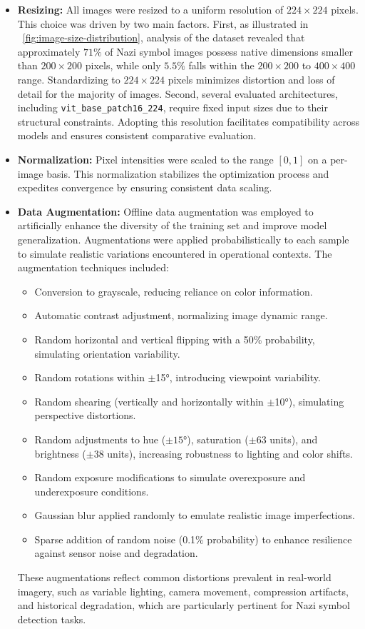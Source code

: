 \begin{itemize}
  \item \textbf{Resizing:} All images were resized to a uniform resolution of $224 \times 224$ pixels. This choice
  was driven by two main factors. First, as illustrated in ~\autoref{fig:image-size-distribution}, analysis
  of the dataset revealed that approximately $71\%$ of Nazi symbol images possess native dimensions smaller than
  $200 \times 200$ pixels, while only $5.5\%$ falls within the $200 \times 200$ to $400 \times 400$ range.
  Standardizing to $224 \times 224$ pixels minimizes distortion and loss of detail for the majority of images. Second,
  several evaluated architectures, including \texttt{vit\_base\_patch16\_224}, require fixed input sizes due to
  their structural constraints. Adopting this resolution facilitates compatibility across models and ensures
  consistent comparative evaluation.

  \item \textbf{Normalization:} Pixel intensities were scaled to the range $[0,1]$ on a per-image basis. This
  normalization stabilizes the optimization process and expedites convergence by ensuring consistent data scaling.

  \item \textbf{Data Augmentation:} Offline data augmentation was employed to artificially enhance the diversity of
  the training set and improve model generalization. Augmentations were applied probabilistically to each sample to
  simulate realistic variations encountered in operational contexts. The augmentation techniques included:
  \begin{itemize}
    \item Conversion to grayscale, reducing reliance on color information.
    \item Automatic contrast adjustment, normalizing image dynamic range.
    \item Random horizontal and vertical flipping with a 50\% probability, simulating orientation variability.
    \item Random rotations within $\pm$15°, introducing viewpoint variability.
    \item Random shearing (vertically and horizontally within $\pm$10°), simulating perspective distortions.
    \item Random adjustments to hue ($\pm15$°), saturation ($\pm$63 units), and brightness ($\pm$38 units), increasing
    robustness to lighting and color shifts.
    \item Random exposure modifications to simulate overexposure and underexposure conditions.
    \item Gaussian blur applied randomly to emulate realistic image imperfections.
    \item Sparse addition of random noise (0.1\% probability) to enhance resilience against sensor noise and degradation.
  \end{itemize}
  These augmentations reflect common distortions prevalent in real-world imagery, such as variable lighting, camera
  movement, compression artifacts, and historical degradation, which are particularly pertinent for Nazi symbol
  detection tasks.
\end{itemize}

